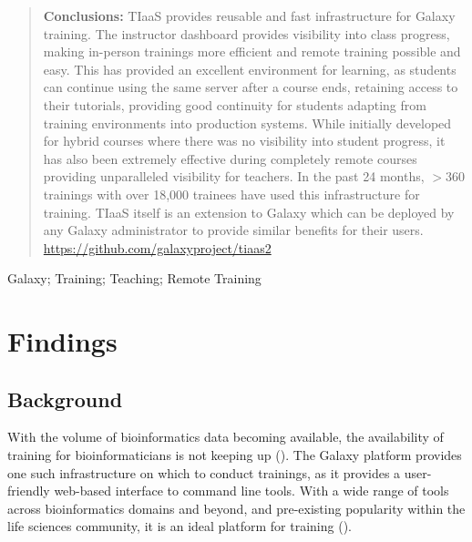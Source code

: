 \documentclass[a4paper,num-refs]{oup-contemporary}
\begin{document}
\begin{frontmatter}
\begin{abstract}
\textbf{Conclusions:} TIaaS provides reusable and fast infrastructure for Galaxy training. The instructor dashboard provides visibility into class progress, making in-person trainings more efficient and remote training possible and easy. This has provided an excellent environment for learning, as students can continue using the same server after a course ends, retaining access to their tutorials, providing good continuity for students adapting from training environments into production systems. While initially developed for hybrid courses where there was no visibility into student progress, it has also been extremely effective during completely remote courses providing unparalleled visibility for teachers. In the past 24 months, $>360$ trainings with over 18,000 trainees have used this infrastructure for training. TIaaS itself is an extension to Galaxy which can be deployed by any Galaxy administrator to provide similar benefits for their users. \url{https://github.com/galaxyproject/tiaas2}
\end{abstract}

\begin{keywords}
Galaxy; Training; Teaching; Remote Training
\end{keywords}
\end{frontmatter}

\section{Findings}
\subsection{Background}


With the volume of bioinformatics data becoming available, the availability of training for bioinformaticians is not keeping up (\cite{Attwood2017}).
The Galaxy platform \cite{afgan2018galaxy} provides one such infrastructure on which to conduct trainings, as it provides a user-friendly web-based interface to command line tools. With a wide range of tools across bioinformatics domains and beyond, and pre-existing popularity within the life sciences community, it is an ideal platform for training (\cite{gtn}).
\end{document}
